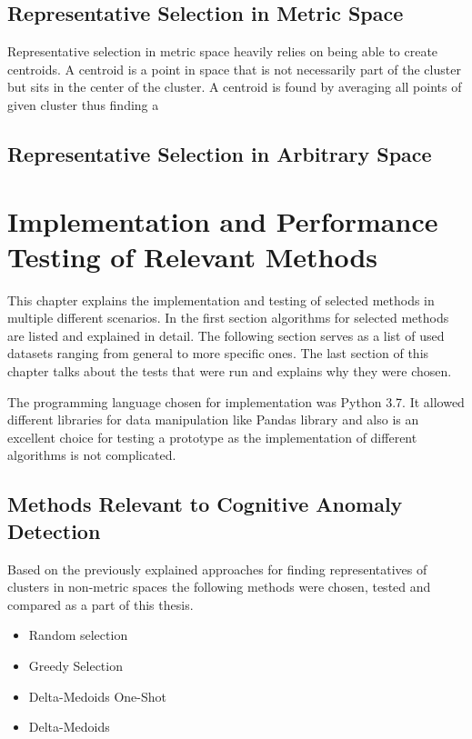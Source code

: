 \documentclass[thesis=B,english]{FITthesis}[2012/10/20]
\begin{document}
\section{Representative Selection in Metric Space}
Representative selection in metric space heavily relies on being able to create centroids.
A centroid is a point in space that is not necessarily part of the cluster but sits in the center of the cluster.
A centroid is found by averaging all points of given cluster thus finding a 

\section{Representative Selection in Arbitrary Space}


\chapter{Implementation and Performance Testing of Relevant Methods}

This chapter explains the implementation and testing of selected methods in multiple different scenarios.
In the first section algorithms for selected methods are listed and explained in detail.
The following section serves as a list of used datasets ranging from general to more specific ones.
The last section of this chapter talks about the tests that were run and explains why they were chosen.

The programming language chosen for implementation was Python 3.7.                    
It allowed different libraries for data manipulation like Pandas library and also is an excellent choice for testing a prototype as the implementation of different algorithms is not complicated.
                                                                                  
\section{Methods Relevant to Cognitive Anomaly Detection}

Based on the previously explained approaches for finding representatives of clusters in non-metric spaces the following methods were chosen, tested and compared as a part of this thesis.
\begin{itemize}
    \item Random selection
    \item Greedy Selection
    \item Delta-Medoids One-Shot
    \item Delta-Medoids 
\end{itemize}
\end{document}
